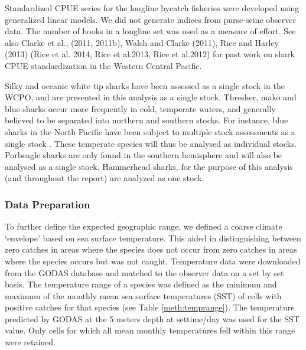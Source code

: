 Standardized CPUE series for the longline bycatch fisheries were developed using generalized linear models. We did not generate indices from purse-seine observer data. The number of hooks in a longline set was used as a measure of effort.
See also Clarke et al., (2011, 2011b),  Walsh and Clarke (2011), Rice and Harley (2013) (Rice et al. 2014, Rice et al.2013, Rice et al.2012)  for past work on shark CPUE standardization in the Western Central Pacific.
                                                                                       
Silky and oceanic white tip sharks have been assessed \citep{Rice2012_a, Rice2013_a} as a single stock in the WCPO, and are presented in this analysis as a single stock.  Thresher, mako and blue sharks occur more frequently in cold, temperate waters, and generally believed to be separated into northern and southern stocks. For instance, blue sharks in the North Pacific have been subject to multiple stock assessments as a single stock \citep{XXXX}. These temperate species will thus be analysed as individual stocks. Porbeagle sharks are only found in the southern hemisphere and will also be analysed as a single stock. Hammerhead sharks, for the purpose of this analysis (and throughout the report) are analyzed as one stock.

\subsubsection{Data Preparation}
To further define the expected geographic range, we defined a coarse climate `envelope' based on sea surface temperature. This aided in distinguishing between zero catches in areas where the species does not occur from zero catches in areas where the species occurs but was not caught. Temperature data were downloaded from the GODAS database \citep{GODASXXXX_a} and matched to the observer data on a set by set basis. The temperature range of a species was defined as the minimum and maximum of the monthly mean sea surface temperatures (SST) of cells with positive catches for that species (see Table \ref{meth:temprange}). The temperature predicted by GODAS at the 5 meters depth at settime/day was used for the SST value. Only cells for which all mean monthly temperatures fell within this range were retained. %
                                                                                       
